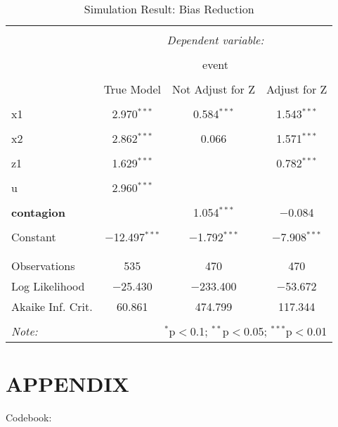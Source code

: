 \documentclass[11pt]{article}
\begin{document}
\begin{table}[!htbp] \centering 
  \caption{Simulation Result: Bias Reduction} 
  \label{} 
\begin{tabular}{@{\extracolsep{5pt}}lccc} 
\\[-1.8ex]\hline 
\hline \\[-1.8ex] 
 & \multicolumn{3}{c}{\textit{Dependent variable:}} \\ 
\cline{2-4} 
\\[-1.8ex] & \multicolumn{3}{c}{event} \\ 
\\[-1.8ex] & True Model & Not Adjust for Z & Adjust for Z\\ 
\hline \\[-1.8ex] 
 x1 & 2.970$^{***}$ & 0.584$^{***}$ & 1.543$^{***}$ \\ 
  & & & \\ 
 x2 & 2.862$^{***}$ & 0.066 & 1.571$^{***}$ \\ 
  & & & \\ 
 z1 & 1.629$^{***}$ &  & 0.782$^{***}$ \\ 
  & & & \\ 
 u & 2.960$^{***}$ &  &  \\ 
  & & & \\ 
 \textbf{contagion} &  & 1.054$^{***}$ & $-$0.084 \\ 
  & & & \\ 
 Constant & $-$12.497$^{***}$ & $-$1.792$^{***}$ & $-$7.908$^{***}$ \\ 
  & & & \\ 
\hline \\[-1.8ex] 
Observations & 535 & 470 & 470 \\ 
Log Likelihood & $-$25.430 & $-$233.400 & $-$53.672 \\ 
Akaike Inf. Crit. & 60.861 & 474.799 & 117.344 \\ 
\hline 
\hline \\[-1.8ex] 
\textit{Note:}  & \multicolumn{3}{r}{$^{*}$p$<$0.1; $^{**}$p$<$0.05; $^{***}$p$<$0.01} \\ 
\end{tabular} 
\end{table} 

\clearpage
\newpage
\section*{APPENDIX	}
Codebook:\\
\end{document}
